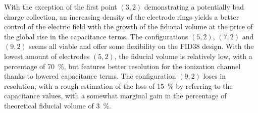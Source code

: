 With the exception of the first point $(3,2)$ demonstrating a potentially bad charge collection, an increasing density of the electrode rings yields a better control of the electric field with the growth of the fiducial volume at the price of the global rise in the capacitance terms. The configurations $(5,2)$, $(7,2)$ and $(9,2)$ seems all viable and offer some flexibility on the FID38 design. With the lowest amount of electrodes $(5,2)$, the fiducial volume is relatively low, with a percentage of  \SI{70}{\percent}, but features better resolution for the ionization channel thanks to lowered capacitance terms. The configuration $(9,2)$ loses in resolution, with a rough estimation of the loss of \SI{15}{\percent} by referring to the capacitance values, with a somewhat marginal gain in the percentage of theoretical fiducial volume of \SI{3}{\percent}.
